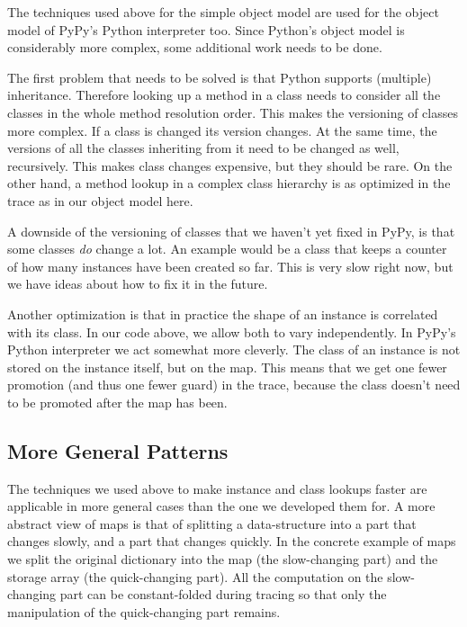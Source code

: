 \documentclass{sigplanconf}
\begin{document}
The techniques used above for the simple object model are used for the object
model of PyPy's Python interpreter too. Since Python's object model is
considerably more complex, some additional work needs to be done.

The first problem that needs to be solved is that Python supports (multiple)
inheritance. Therefore looking up a method in a class needs to consider all the
classes in the
whole method resolution order. This makes the versioning of classes more
complex. If a class is changed its version changes. At the same time, the
versions of all the classes inheriting from it need to be changed as well,
recursively. This makes class changes expensive, but they should be rare.  On the
other hand, a method lookup in a complex class hierarchy is as optimized in the
trace as in our object model here.

A downside of the versioning of classes that we haven't yet fixed in PyPy, is
that some classes \emph{do} change a lot. An example would be a class that keeps a
counter of how many instances have been created so far. This is very slow right
now, but we have ideas about how to fix it in the future.

Another optimization is that in practice the shape of an instance is correlated
with its class. In our code above, we allow both to vary independently.
In PyPy's Python interpreter we act somewhat more cleverly. The class of
an instance is not stored on the instance itself, but on the map. This means
that we get one fewer promotion (and thus one fewer guard) in the trace,
because the class doesn't need to
be promoted after the map has been.



\subsection{More General Patterns}

The techniques we used above to make instance and class lookups faster are
applicable in more general cases than the one we developed them for. A more
abstract view of maps is that of splitting a data-structure into a part that
changes slowly, and a part that changes quickly. In the concrete example of maps
we split the original dictionary into the map (the slow-changing part) and the
storage array (the quick-changing part). All the computation on the
slow-changing part can be constant-folded during tracing so that only the
manipulation of the quick-changing part remains.
\end{document}
